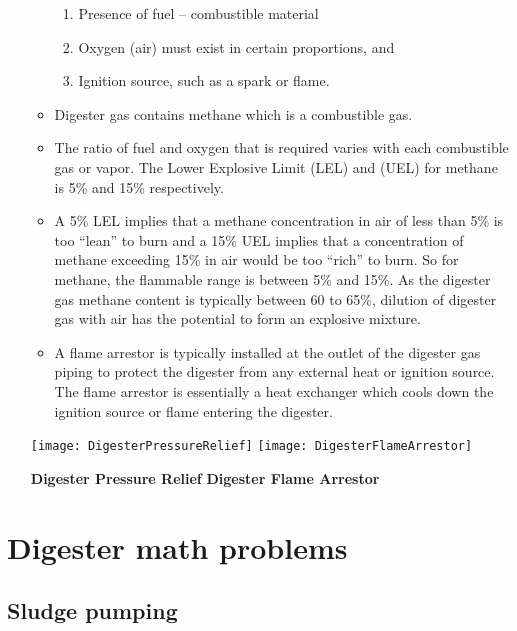 \begin{enumerate}[A.]
\begin{itemize}
\begin{enumerate}
                    \item Presence of fuel – combustible material
                    \item Oxygen (air) must exist in certain proportions, and
                    \item Ignition source, such as a spark or flame.
                \end{enumerate}  
            \item Digester gas contains methane which is a combustible gas.  
            \item The ratio of fuel and oxygen that is required varies with each combustible gas or vapor. The Lower Explosive Limit (LEL) and (UEL) for methane is 5\% and 15\% respectively.  
            \item A 5\% LEL implies that a methane concentration in air of less than 5\% is too “lean” to burn and a 15\% UEL implies that a concentration of methane exceeding 15\% in air would be too “rich” to burn.  So for methane, the flammable range is between 5\% and 15\%.  As the digester gas methane content is typically between 60 to 65\%, dilution of digester gas with air has the potential to form an explosive mixture. 
            \item A flame arrestor is typically installed at the outlet of the digester gas piping to protect the digester from any external heat or ignition source.  The flame arrestor is essentially a heat exchanger which cools down the ignition source or flame entering the digester. 
        \end{itemize}
        \newpage
        \begin{center}
            \texttt{[image: DigesterPressureRelief]} \hspace{5cm} \texttt{[image: DigesterFlameArrestor]} \\
        \end{center}
        \hspace{2cm}\textbf{Digester Pressure Relief} \hspace{3cm} \textbf{Digester Flame Arrestor}\\
\end{enumerate}

\section{Digester math problems}

\subsection{Sludge pumping}

